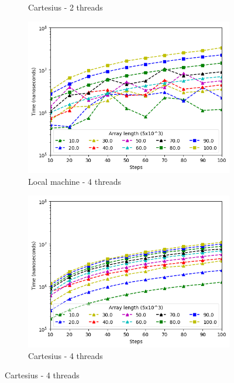 \documentclass[a4paper]{article}
\begin{document}
\begin{figure}[htbp]
\begin{subfigure}{.42\textwidth}
  \caption{Cartesius - 2 threads}
  \label{subfig:steps_thread2_parall_cart}
\end{subfigure}
\begin{subfigure}{.42\textwidth}
  \centering
  \includegraphics[width=\linewidth]{res/parallel/array_thread_4_steps_res.png}
  \caption{Local machine - 4 threads}
  \label{subfig:steps_thread4_parall}
\end{subfigure}%
\begin{subfigure}{.42\textwidth}
  \centering
  \includegraphics[width=\linewidth]{res/parallel/array_thread_4_steps_res_cartesius.png}
  \caption{Cartesius - 4 threads}
  \label{subfig:steps_thread4_parall_cart}
\end{subfigure}

\end{figure}
\end{document}
